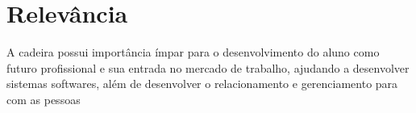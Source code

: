 \documentclass{article}
\begin{document}
\vspace{2 cm}

\section{Relevância}
{A cadeira possui importância ímpar para o desenvolvimento do aluno como futuro profissional e sua entrada no mercado de trabalho, ajudando a desenvolver sistemas softwares, além de desenvolver o relacionamento e gerenciamento para com as pessoas}

\vspace{2 cm}



\end{document}
